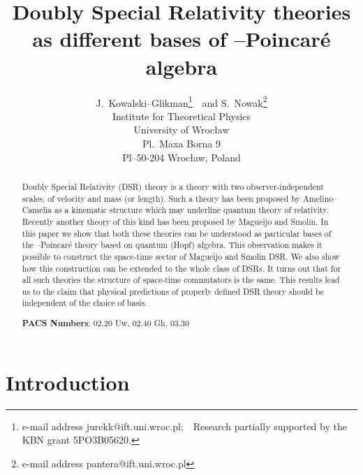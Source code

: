 \documentclass[a4paper,a4paper]{article}
\begin{document}
\title{%
Doubly Special Relativity theories as different bases of
\myHighlight{$\kappa$}\coordHE{}--Poincar\'e algebra}
\author{ J.\ Kowalski--Glikman\thanks{e-mail
address jurekk@ift.uni.wroc.pl;\ \ Research  partially supported
by the    KBN grant 5PO3B05620.}~~and S.\ Nowak\thanks{e-mail
address pantera@ift.uni.wroc.pl}\\ Institute for Theoretical
Physics\\ University of Wroc\l{}aw\\ Pl.\ Maxa Borna 9\\
Pl--50-204 Wroc\l{}aw, Poland} \maketitle

\begin{abstract}
Doubly Special Relativity (DSR) theory is a theory with two
observer-independent scales, of velocity and mass  (or length).
Such a theory has been proposed by Amelino--Camelia as a kinematic
structure which may underline quantum theory of relativity.
Recently another theory of this kind has been proposed by Magueijo
and Smolin. In this paper we show that both these theories can be
understood as particular bases of the \myHighlight{$\kappa$}\coordHE{}--Poincar\'e theory
based on quantum (Hopf) algebra. This observation makes it
possible to construct the space-time sector of Magueijo and Smolin
DSR. We  also show how this construction can be extended to the
whole class of DSRs. It turns out that for all such theories the
structure of space-time commutators is the same. This results lead
us to the claim that physical predictions of properly defined DSR
theory should be independent of the choice of basis.
\newline

{\bf PACS Numbers}: 02.20 Uw, 02.40 Gh, 03.30
\end{abstract}

\clearpage

\section{Introduction}
\end{document}
